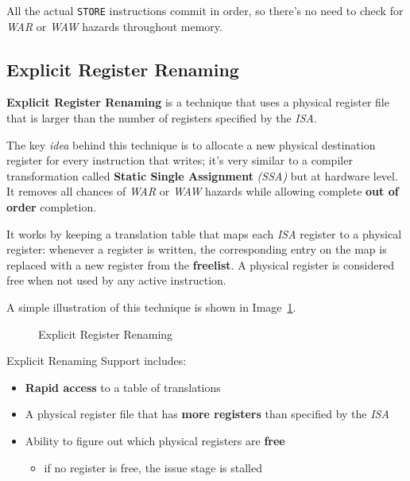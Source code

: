 \documentclass[english]{article}
\begin{document}
All the actual \texttt{STORE} instructions commit in order, so there's no need to check for \textit{WAR} or \textit{WAW} hazards throughout memory.

\subsection{Explicit Register Renaming}

\textbf{Explicit Register Renaming} is a technique that uses a physical register file that is larger than the number of registers specified by the \textit{ISA}.

The key \textit{idea} behind this technique is to allocate a new physical destination register for every instruction that writes;
it's very similar to a compiler transformation called \textbf{Static Single Assignment} \textit{(SSA)} but at hardware level.
It removes all chances of \textit{WAR} or \textit{WAW} hazards while allowing complete \textbf{out of order} completion.

It works by keeping a translation table that maps each \textit{ISA} register to a physical register:
whenever a register is written, the corresponding entry on the map is replaced with a new register from the \textbf{freelist}.
A physical register is considered free when not used by any active instruction.

A simple illustration of this technique is shown in Image~\ref{fig:explicit-register-renaming}.

\begin{figure}[htbp]
  \bigskip
  \centering
  \caption{Explicit Register Renaming}
  \label{fig:explicit-register-renaming}
  \bigskip
\end{figure}

Explicit Renaming Support includes:

\begin{itemize}
  \item \textbf{Rapid access} to a table of translations
  \item A physical register file that has \textbf{more registers} than specified by the \textit{ISA}
  \item Ability to figure out which physical registers are \textbf{free}
        \begin{itemize}
          \item if no register is free, the issue stage is stalled
        \end{itemize}
\end{itemize}
\end{document}
